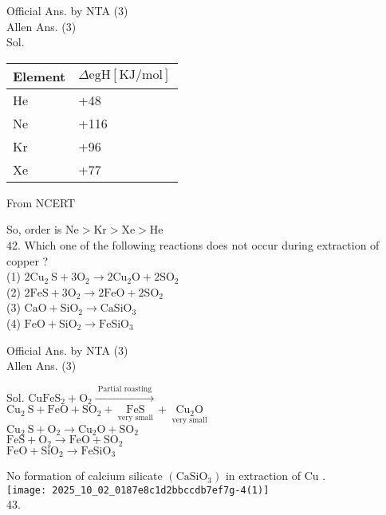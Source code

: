 \documentclass[10pt]{article}
\begin{document}
Official Ans. by NTA (3)\\
Allen Ans. (3)\\
Sol.

\begin{center}
\begin{tabular}{|l|l|}
\hline
Element & \(\Delta \mathrm{egH}[\mathrm{KJ} / \mathrm{mol}]\) \\
\hline
He & +48 \\
\hline
Ne & +116 \\
\hline
Kr & +96 \\
\hline
Xe & +77 \\
\hline
\end{tabular}
\end{center}

From NCERT

So, order is \(\mathrm{Ne}>\mathrm{Kr}>\mathrm{Xe}>\mathrm{He}\)\\
42. Which one of the following reactions does not occur during extraction of copper ?\\
(1) \(2 \mathrm{Cu}_{2} \mathrm{~S}+3 \mathrm{O}_{2} \rightarrow 2 \mathrm{Cu}_{2} \mathrm{O}+2 \mathrm{SO}_{2}\)\\
(2) \(2 \mathrm{FeS}+3 \mathrm{O}_{2} \rightarrow 2 \mathrm{FeO}+2 \mathrm{SO}_{2}\)\\
(3) \(\mathrm{CaO}+\mathrm{SiO}_{2} \rightarrow \mathrm{CaSiO}_{3}\)\\
(4) \(\mathrm{FeO}+\mathrm{SiO}_{2} \rightarrow \mathrm{FeSiO}_{3}\)

Official Ans. by NTA (3)\\
Allen Ans. (3)

Sol. \(\mathrm{CuFeS}_{2}+\mathrm{O}_{2} \xrightarrow{\text { Partial roasting }}\)\\
\(\mathrm{Cu}_{2} \mathrm{~S}+\mathrm{FeO}+\mathrm{SO}_{2}+\underset{\text { very small }}{\mathrm{FeS}}+\underset{\text { very small }}{\mathrm{Cu}_{2} \mathrm{O}}\)\\
\(\mathrm{Cu}_{2} \mathrm{~S}+\mathrm{O}_{2} \rightarrow \mathrm{Cu}_{2} \mathrm{O}+\mathrm{SO}_{2}\)\\
\(\mathrm{FeS}+\mathrm{O}_{2} \rightarrow \mathrm{FeO}+\mathrm{SO}_{2}\)\\
\(\mathrm{FeO}+\mathrm{SiO}_{2} \rightarrow \mathrm{FeSiO}_{3}\)

No formation of calcium silicate \(\left(\mathrm{CaSiO}_{3}\right)\) in extraction of Cu .\\
\texttt{[image: 2025\_10\_02\_0187e8c1d2bbccdb7ef7g-4(1)]}\\
43.
\end{document}
